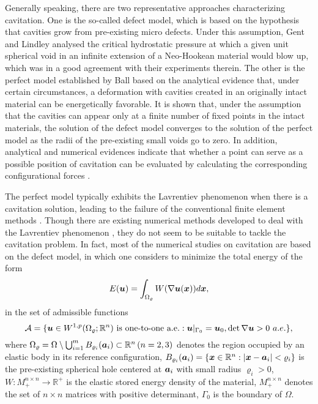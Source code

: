 \documentclass[12pt]{article}
\renewcommand{\vec}[1]{\mbox{\boldmath$#1$}}
\numberwithin{equation}{section}
\begin{document}
Generally speaking, there are two representative approaches characterizing cavitation.
One is the so-called defect model, which is based on the hypothesis that cavities grow
from pre-existing micro defects. Under this assumption, Gent and Lindley
\cite{Gent and Lindley} analysed the critical hydrostatic pressure at which
a given unit spherical void in an infinite extension of a Neo-Hookean material
would blow up, which was in a good agreement with their experiments therein. The other
is the perfect model established by Ball \cite{Ball82} based on the analytical evidence
that, under certain circumstances, a deformation with cavities created in an
originally intact material can be energetically favorable. It is shown that, under the
assumption that the cavities can appear only at a finite number of fixed points in the
intact materials, the solution of the defect model converges to the solution of the
perfect model \cite{Henao2009, Sival2006} as the radii of the pre-existing small voids
go to zero. In addition, analytical and numerical evidences indicate that whether a
point can serve as a possible position of cavitation can be evaluated by calculating
the corresponding configurational forces \cite{Lian and Li iso, Sival2002}.


The perfect model typically exhibits the Lavrentiev phenomenon \cite{Lavrentiev} when
there is a cavitation solution, leading to the failure of the conventional finite element
methods \cite{Bai and Li, Ball and Knowles}.
Though there are existing numerical methods developed to deal with the Lavrentiev
phenomenon \cite{Bai and Li, Ball and Knowles, Z. Li, Marrero and Betancourt},
they do not seem to be suitable to tackle the cavitation problem.
In fact, most of the numerical studies on cavitation are based on the defect model,
in which one considers to minimize the total energy of the form
\begin{equation}
  \label{functional}
  E(\vec{u})=\int_{\Omega_\varrho}W(\nabla \vec{u}(\vec{x}))d\vec{x},
\end{equation}
in the set of admissible functions
\begin{equation}
  \label{admissible set}
  \mathcal{A}=\{\vec{u}\in W^{1,p}(\Omega_\varrho;\mathbb{R}^n) \ \mbox{is one-to-one
  a.e.}: \vec{u}|_{\Gamma_0}=\vec{u}_0, \det \nabla \vec{u} >0 \ a.e. \},
\end{equation}
where $\Omega_\varrho = \Omega \setminus \bigcup_{i=1}^{m}
B_{\varrho_i}(\vec{a}_i)\subset\mathbb{R}^{n}\,(n=2,3)$
denotes the region occupied by an elastic body in its reference configuration,
$B_{\varrho_i}(\vec{a}_i)=\{\vec{x}\in\mathbb{R}^n:|\vec{x}-\vec{a}_i|<\varrho_i\}$ is
the pre-existing spherical hole centered at $\vec{a}_i$ with small radius $\varrho_i>0$,
$W: M^{n \times n}_+\rightarrow\mathbb{R}^+$ is the elastic stored energy density of the
material, $M_+^{n \times n}$ denotes the set of $n \times n $ matrices with positive
determinant, $\Gamma_0$ is the boundary of $\Omega$.
\end{document}
